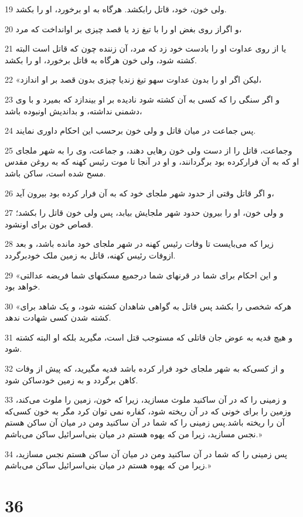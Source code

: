 \par 19 ولی خون، خود، قاتل رابکشد. هرگاه به او برخورد، او را بکشد.
\par 20 و اگراز روی بغض او را با تیغ زد یا قصد چیزی بر اوانداخت که مرد،
\par 21 یا از روی عداوت او را بادست خود زد که مرد، آن زننده چون که قاتل است البته کشته شود، ولی خون هرگاه به قاتل برخورد، او را بکشد.
\par 22 «لیکن اگر او را بدون عداوت سهو تیغ زندیا چیزی بدون قصد بر او اندازد،
\par 23 و اگر سنگی را که کسی به آن کشته شود نادیده بر او بیندازد که بمیرد و با وی دشمنی نداشته، و بداندیش اونبوده باشد،
\par 24 پس جماعت در میان قاتل و ولی خون برحسب این احکام داوری نمایند.
\par 25 وجماعت، قاتل را از دست ولی خون رهایی دهند، و جماعت، وی را به شهر ملجای او که به آن فرارکرده بود برگردانند، و او در آنجا تا موت رئیس کهنه که به روغن مقدس مسح شده است، ساکن باشد.
\par 26 و اگر قاتل وقتی از حدود شهر ملجای خود که به آن فرار کرده بود بیرون آید،
\par 27 و ولی خون، او را بیرون حدود شهر ملجایش بیابد، پس ولی خون قاتل را بکشد؛ قصاص خون برای اونشود.
\par 28 زیرا که می‌بایست تا وفات رئیس کهنه در شهر ملجای خود مانده باشد، و بعد ازوفات رئیس کهنه، قاتل به زمین ملک خودبرگردد.
\par 29 «و این احکام برای شما در قرنهای شما درجمیع مسکنهای شما فریضه عدالتی خواهد بود.
\par 30 «هر‌که شخصی را بکشد پس قاتل به گواهی شاهدان کشته شود، و یک شاهد برای کشته شدن کسی شهادت ندهد.
\par 31 و هیچ فدیه به عوض جان قاتلی که مستوجب قتل است، مگیرید بلکه او البته کشته شود.
\par 32 و از کسی‌که به شهر ملجای خود فرار کرده باشد فدیه مگیرید، که پیش از وفات کاهن برگردد و به زمین خودساکن شود.
\par 33 و زمینی را که در آن ساکنید ملوث مسازید، زیرا که خون، زمین را ملوث می‌کند، وزمین را برای خونی که در آن ریخته شود، کفاره نمی توان کرد مگر به خون کسی‌که آن را ریخته باشد.پس زمینی را که شما در آن ساکنید ومن در میان آن ساکن هستم نجس مسازید، زیرا من که یهوه هستم در میان بنی‌اسرائیل ساکن می‌باشم.»
\par 34 پس زمینی را که شما در آن ساکنید ومن در میان آن ساکن هستم نجس مسازید، زیرا من که یهوه هستم در میان بنی‌اسرائیل ساکن می‌باشم.»
 
\chapter{36}


